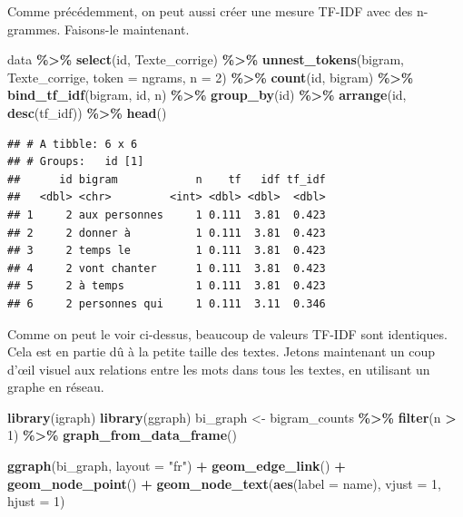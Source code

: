 \documentclass[
]{article}
\newenvironment{Shaded}{\begin{snugshade}}{\end{snugshade}}
\newcommand{\AttributeTok}[1]{\textcolor[rgb]{0.13,0.29,0.53}{#1}}
\newcommand{\DecValTok}[1]{\textcolor[rgb]{0.00,0.00,0.81}{#1}}
\newcommand{\FunctionTok}[1]{\textcolor[rgb]{0.13,0.29,0.53}{\textbf{#1}}}
\newcommand{\NormalTok}[1]{#1}
\newcommand{\OtherTok}[1]{\textcolor[rgb]{0.56,0.35,0.01}{#1}}
\newcommand{\SpecialCharTok}[1]{\textcolor[rgb]{0.81,0.36,0.00}{\textbf{#1}}}
\newcommand{\StringTok}[1]{\textcolor[rgb]{0.31,0.60,0.02}{#1}}
\begin{document}
Comme précédemment, on peut aussi créer une mesure TF-IDF avec des
n-grammes. Faisons-le maintenant.

\begin{Shaded}
\begin{Highlighting}[]
\NormalTok{data }\SpecialCharTok{\%\textgreater{}\%}
  \FunctionTok{select}\NormalTok{(id, Texte\_corrige) }\SpecialCharTok{\%\textgreater{}\%}
  \FunctionTok{unnest\_tokens}\NormalTok{(bigram, Texte\_corrige, }\AttributeTok{token =} \StringTok{\textquotesingle{}ngrams\textquotesingle{}}\NormalTok{, }\AttributeTok{n =} \DecValTok{2}\NormalTok{) }\SpecialCharTok{\%\textgreater{}\%}
  \FunctionTok{count}\NormalTok{(id, bigram) }\SpecialCharTok{\%\textgreater{}\%}
  \FunctionTok{bind\_tf\_idf}\NormalTok{(bigram, id, n) }\SpecialCharTok{\%\textgreater{}\%}
  \FunctionTok{group\_by}\NormalTok{(id) }\SpecialCharTok{\%\textgreater{}\%}
  \FunctionTok{arrange}\NormalTok{(id, }\FunctionTok{desc}\NormalTok{(tf\_idf)) }\SpecialCharTok{\%\textgreater{}\%}
  \FunctionTok{head}\NormalTok{()}
\end{Highlighting}
\end{Shaded}

\begin{verbatim}
## # A tibble: 6 x 6
## # Groups:   id [1]
##      id bigram            n    tf   idf tf_idf
##   <dbl> <chr>         <int> <dbl> <dbl>  <dbl>
## 1     2 aux personnes     1 0.111  3.81  0.423
## 2     2 donner à          1 0.111  3.81  0.423
## 3     2 temps le          1 0.111  3.81  0.423
## 4     2 vont chanter      1 0.111  3.81  0.423
## 5     2 à temps           1 0.111  3.81  0.423
## 6     2 personnes qui     1 0.111  3.11  0.346
\end{verbatim}

Comme on peut le voir ci-dessus, beaucoup de valeurs TF-IDF sont
identiques. Cela est en partie dû à la petite taille des textes. Jetons
maintenant un coup d'œil visuel aux relations entre les mots dans tous
les textes, en utilisant un graphe en réseau.

\begin{Shaded}
\begin{Highlighting}[]
\FunctionTok{library}\NormalTok{(}\StringTok{\textquotesingle{}igraph\textquotesingle{}}\NormalTok{)}
\FunctionTok{library}\NormalTok{(}\StringTok{\textquotesingle{}ggraph\textquotesingle{}}\NormalTok{)}
\NormalTok{bi\_graph }\OtherTok{\textless{}{-}}\NormalTok{ bigram\_counts }\SpecialCharTok{\%\textgreater{}\%}
  \FunctionTok{filter}\NormalTok{(n }\SpecialCharTok{\textgreater{}} \DecValTok{1}\NormalTok{) }\SpecialCharTok{\%\textgreater{}\%} 
  \FunctionTok{graph\_from\_data\_frame}\NormalTok{()}

\FunctionTok{ggraph}\NormalTok{(bi\_graph, }\AttributeTok{layout =} \StringTok{"fr"}\NormalTok{) }\SpecialCharTok{+}
  \FunctionTok{geom\_edge\_link}\NormalTok{() }\SpecialCharTok{+}
  \FunctionTok{geom\_node\_point}\NormalTok{() }\SpecialCharTok{+}
  \FunctionTok{geom\_node\_text}\NormalTok{(}\FunctionTok{aes}\NormalTok{(}\AttributeTok{label =}\NormalTok{ name), }\AttributeTok{vjust =} \DecValTok{1}\NormalTok{, }\AttributeTok{hjust =} \DecValTok{1}\NormalTok{)}
\end{Highlighting}
\end{Shaded}
\end{document}
